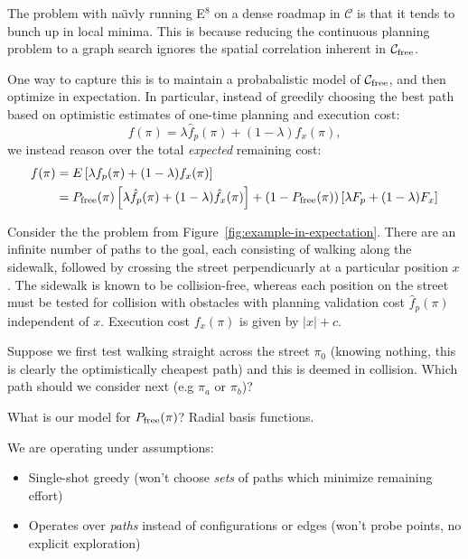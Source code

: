 {The problem with na\"{\i}vly running E$^8$ on a
dense roadmap in $\mathcal{C}$
is that it tends to bunch up in local minima.
This is because reducing the continuous planning problem
to a graph search ignores the spatial correlation
inherent in $\mathcal{C}_{\mbox{\scriptsize free}}$.

One way to capture this is to maintain a probabalistic model
of $\mathcal{C}_{\mbox{\scriptsize free}}$,
and then optimize in expectation.
In particular,
instead of greedily choosing the best path based on
optimistic estimates of one-time planning and execution cost:
\begin{equation}
   f(\pi) = \lambda \hat{f}_p(\pi) + (1-\lambda) \hat{f}_x(\pi),
\end{equation}
we instead reason over the total \emph{expected} remaining cost:
\begin{align}
   f(\pi)
      &= E \left[ \lambda f_p(\pi) + (1-\lambda) f_x(\pi) \right] \\
   &= P_{\mbox{\scriptsize free}}(\pi)
      \left[ \lambda \hat{f}_p(\pi) + (1-\lambda) \hat{f}_x(\pi) \right]
      + (1-P_{\mbox{\scriptsize free}}(\pi))
      \left[ \lambda F_p + (1-\lambda) F_x \right]
\end{align}

Consider the the problem from Figure~\ref{fig:example-in-expectation}.
There are an infinite number of paths to the goal,
each consisting of walking along the sidewalk,
followed by crossing the street perpendicuarly at a particular
position $x$.
The sidewalk is known to be collision-free,
whereas each position on the street must be tested for collision
with obstacles with planning validation cost $\hat{f}_p(\pi)$
independent of $x$.
Execution cost $f_x(\pi)$ is given by $|x|+c$.

Suppose we first test walking straight across the street $\pi_0$
(knowing nothing, this is clearly the optimistically cheapest path)
and this is deemed in collision.
Which path should we consider next (e.g $\pi_a$ or $\pi_b$)?

What is our model for $P_{\mbox{\scriptsize free}}(\pi)$?
Radial basis functions.

We are operating under assumptions:
\begin{itemize}
\item Single-shot greedy (won't choose \emph{sets} of paths
   which minimize remaining effort)
\item Operates over \emph{paths} instead of configurations
   or edges (won't probe points, no explicit exploration)
\end{itemize}

}
